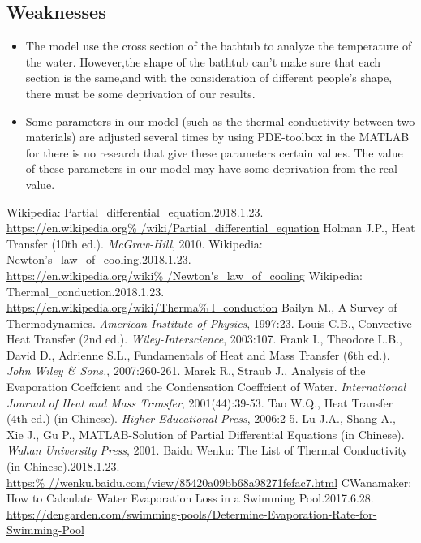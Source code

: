 \documentclass[12pt]{article}
\begin{document}
\subsection{Weaknesses}
\begin{itemize}
    \item The model use the cross section of the bathtub to analyze the temperature of the water.
    However,the shape of the bathtub can't make sure that each section is the same,and with the
    consideration of different people's shape, there must be some deprivation of our results.
    \item Some parameters in our model (such as the thermal conductivity between two materials) are
    adjusted several times by using PDE-toolbox in the MATLAB for there is no research that give
    these parameters certain values. The value of these parameters in our model may have some
    deprivation from the real value.
\end{itemize}

\clearpage
\begin{thebibliography}{99}
Wikipedia: Partial\_differential\_equation.2018.1.23.\\ \url{https://en.wikipedia.org%
/wiki/Partial\_differential\_equation}
Holman J.P., Heat Transfer (10th ed.). \emph{McGraw-Hill}, 2010.
Wikipedia: Newton's\_law\_of\_cooling.2018.1.23.\\ \url{https://en.wikipedia.org/wiki%
/Newton's\_law\_of\_cooling}
Wikipedia: Thermal\_conduction.2018.1.23.\\ \url{https://en.wikipedia.org/wiki/Therma%
l\_conduction}
Bailyn M., A Survey of Thermodynamics. \emph{American Institute of Physics}, 1997:23.
Louis C.B., Convective Heat Transfer (2nd ed.). \emph{Wiley-Interscience}, 2003:107.
Frank I., Theodore L.B., David D., Adrienne S.L., Fundamentals of Heat and Mass Transfer
(6th ed.). \emph{John Wiley \& Sons.}, 2007:260-261.
Marek R., Straub J., Analysis of the Evaporation Coeffcient and the Condensation
Coeffcient of Water. \emph{International Journal of Heat and Mass Transfer}, 2001(44):39-53.
Tao W.Q., Heat Transfer (4th ed.) (in Chinese). \emph{Higher Educational Press},
2006:2-5.
Lu J.A., Shang A., Xie J., Gu P., MATLAB-Solution of Partial Differential Equations (in
Chinese). \emph{Wuhan University Press}, 2001.
Baidu Wenku: The List of Thermal Conductivity (in Chinese).2018.1.23.\\ \url{https:%
//wenku.baidu.com/view/85420a09bb68a98271fefac7.html}
CWanamaker: How to Calculate Water Evaporation Loss in a Swimming Pool.2017.6.28.\\
\url{https://dengarden.com/swimming-pools/Determine-Evaporation-Rate-for-Swimming-Pool}
\end{thebibliography}
\end{document}

